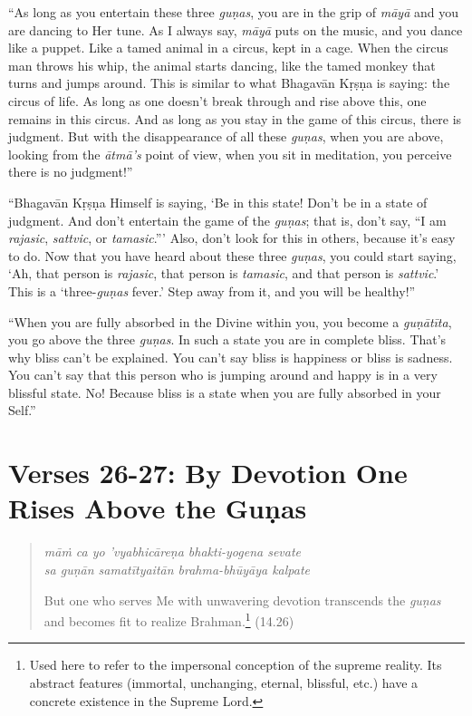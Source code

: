 \documentclass[12pt, twoside, openright]{memoir}
\begin{document}
\enquote{As long as you entertain these three \textit{guṇas}, you are in the grip of \textit{māyā} and you are dancing to Her tune. As I always say, \textit{māyā} puts on the music, and you dance like a puppet. Like a tamed animal in a circus, kept in a cage. When the circus man throws his whip, the animal starts dancing, like the tamed monkey that turns and jumps around. This is similar to what Bhagavān Kṛṣṇa is saying: the circus of life. As long as one doesn’t break through and rise above this, one remains in this circus. And as long as you stay in the game of this circus, there is judgment. But with the disappearance of all these \textit{guṇas}, when you are above, looking from the \textit{ātmā’s} point of view, when you sit in meditation, you perceive there is no judgment!}

\enquote{Bhagavān Kṛṣṇa Himself is saying, \enquote{Be in this state! Don’t be in a state of judgment. And don’t entertain the game of the \textit{guṇas}; that is, don’t say, \enquote{I am \textit{rajasic}, \textit{sattvic}, or \textit{tamasic}.}} Also, don’t look for this in others, because it’s easy to do. Now that you have heard about these three \textit{guṇas}, you could start saying, \enquote{Ah, that person is \textit{rajasic}, that person is \textit{tamasic}, and that person is \textit{sattvic}.} This is a \enquote{three-\textit{guṇas} fever.} Step away from it, and you will be healthy!}

\enquote{When you are fully absorbed in the Divine within you, you become a \textit{guṇātīta}, you go above the three \textit{guṇas}. In such a state you are in complete bliss. That’s why bliss can’t be explained. You can’t say bliss is happiness or bliss is sadness. You can’t say that this person who is jumping around and happy is in a very blissful state. No! Because bliss is a state when you are fully absorbed in your Self.}

\section{Verses 26-27: By Devotion One Rises Above the Guṇas}\label{sec-verses-26-27-by-devotion-one-rises-above-the-gunas}


\par
\begin{verse}
\textit{māṁ ca yo ’vyabhicāreṇa bhakti-yogena sevate} \\
\textit{sa guṇān samatītyaitān brahma-bhūyāya kalpate}

\noindent But one who serves Me with unwavering devotion transcends the \textit{guṇas} and becomes fit to realize Brahman.\footnote{Used here to refer to the impersonal conception of the supreme reality. Its abstract features (immortal, unchanging, eternal, blissful, etc.) have a concrete existence in the Supreme Lord.} (14.26)
\end{verse}
\par
\end{document}
